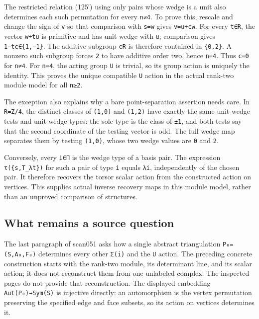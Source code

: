 \documentclass[
  10pt,
]{article}
\begin{document}
The restricted relation (125′) using only pairs whose wedge is a unit
also determines each such permutation for every \texttt{\small n≠4}. To
prove this, rescale and change the sign of \texttt{\small v} so that
comparison with \texttt{\small s=\allowbreak{}w} gives
\texttt{\small v=\allowbreak{}u+\allowbreak{}cw}. For every
\texttt{\small t∈R}, the vector \texttt{\small w+\allowbreak{}tu} is
primitive and has unit wedge with \texttt{\small u}; comparison gives
\texttt{\small 1−tc∈\{1,\allowbreak{}−1\}}. The additive subgroup
\texttt{\small cR} is therefore contained in
\texttt{\small \{0,\allowbreak{}2\}}. A nonzero such subgroup forces
\texttt{\small 2} to have additive order two, hence
\texttt{\small n=\allowbreak{}4}. Thus \texttt{\small c=\allowbreak{}0}
for \texttt{\small n≠4}. For \texttt{\small n=\allowbreak{}4}, the
acting group \texttt{\small U} is trivial, so its group action is
uniquely the identity. This proves the unique compatible
\texttt{\small U} action in the actual rank-two module model for all
\texttt{\small n≥\allowbreak{}2}.

The exception also explains why a bare point-separation assertion needs
care. In \texttt{\small R=\allowbreak{}Z/\allowbreak{}4}, the distinct
classes of \texttt{\small (\allowbreak{}1,\allowbreak{}0)\allowbreak{}}
and \texttt{\small (\allowbreak{}1,\allowbreak{}2)\allowbreak{}} have
exactly the same unit-wedge tests and unit-wedge types: the sole type is
the class of \texttt{\small ±1}, and both tests say that the second
coordinate of the testing vector is odd. The full wedge map separates
them by testing
\texttt{\small (\allowbreak{}1,\allowbreak{}0)\allowbreak{}}, whose two
wedge values are \texttt{\small 0} and \texttt{\small 2}.

Conversely, every \texttt{\small i∈Π} is the wedge type of a basis pair.
The expression
\texttt{\small τ(\allowbreak{}\{s,\allowbreak{}T\_\allowbreak{}λt\})\allowbreak{}}
for such a pair of type \texttt{\small i} equals \texttt{\small λi},
independently of the chosen pair. It therefore recovers the torsor
scalar action from the constructed action on vertices. This supplies
actual inverse recovery maps in this module model, rather than an
unproved comparison of structures.

\subsection{What remains a source
question}\label{what-remains-a-source-question}

The last paragraph of scan051 asks how a single abstract triangulation
\texttt{\small P₀=\allowbreak{}(\allowbreak{}S,\allowbreak{}A₀,\allowbreak{}F₀)\allowbreak{}}
determines every other \texttt{\small Σ(\allowbreak{}i)\allowbreak{}}
and the \texttt{\small U} action. The preceding concrete construction
starts with the rank-two module, its determinant line, and its scalar
action; it does not reconstruct them from one unlabeled complex. The
inspected pages do not provide that reconstruction. The displayed
embedding
\texttt{\small Aut(\allowbreak{}P₀)\allowbreak{}→\allowbreak{}Sym(\allowbreak{}S)\allowbreak{}}
is injective directly: an automorphism is the vertex permutation
preserving the specified edge and face subsets, so its action on
vertices determines it.
\end{document}
